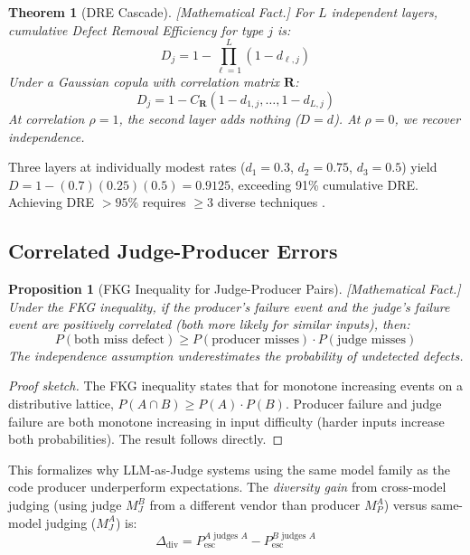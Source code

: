 \documentclass[11pt, a4paper, logo, copyright]{googledeepmind}
\newtheorem{theorem}{Theorem}[section]
\newtheorem{proposition}{Proposition}[section]
\begin{document}
\begin{theorem}[DRE Cascade]
\label{thm:dre-cascade}
\emph{[Mathematical Fact.]} For $L$ independent layers, cumulative Defect Removal Efficiency for type $j$ is:
\begin{equation}
D_j = 1 - \prod_{\ell=1}^{L} (1 - d_{\ell,j})
\end{equation}
Under a Gaussian copula with correlation matrix $\mathbf{R}$:
\begin{equation}
D_j = 1 - C_{\mathbf{R}}(1 - d_{1,j}, \ldots, 1 - d_{L,j})
\end{equation}
At correlation $\rho = 1$, the second layer adds nothing ($D = d$). At $\rho = 0$, we recover independence.
\end{theorem}

Three layers at individually modest rates ($d_1 = 0.3$, $d_2 = 0.75$, $d_3 = 0.5$) yield $D = 1 - (0.7)(0.25)(0.5) = 0.9125$, exceeding 91\% cumulative DRE. Achieving DRE $> 95\%$ requires $\geq 3$ diverse techniques \citep{capersjones2012}.

\subsection{Correlated Judge-Producer Errors}

\begin{proposition}[FKG Inequality for Judge-Producer Pairs]
\label{prop:fkg}
\emph{[Mathematical Fact.]} Under the FKG inequality, if the producer's failure event and the judge's failure event are positively correlated (both more likely for similar inputs), then:
\begin{equation}
    P(\text{both miss defect}) \geq P(\text{producer misses}) \cdot P(\text{judge misses})
\end{equation}
The independence assumption \emph{underestimates} the probability of undetected defects.
\end{proposition}

\begin{proof}[Proof sketch]
The FKG inequality states that for monotone increasing events on a distributive lattice, $P(A \cap B) \geq P(A) \cdot P(B)$. Producer failure and judge failure are both monotone increasing in input difficulty (harder inputs increase both probabilities). The result follows directly.
\end{proof}

This formalizes why LLM-as-Judge systems using the same model family as the code producer underperform expectations. The \emph{diversity gain} from cross-model judging (using judge $M_J^B$ from a different vendor than producer $M_P^A$) versus same-model judging ($M_J^A$) is:
\begin{equation}
\Delta_{\mathrm{div}} = P_{\mathrm{esc}}^{A \text{ judges } A} - P_{\mathrm{esc}}^{B \text{ judges } A}
\end{equation}
\end{document}
